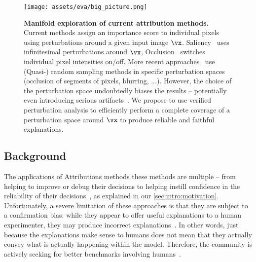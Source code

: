 \begin{figure}[t!]
  \centering
  \texttt{[image: assets/eva/big\_picture.png]}
  \caption{
  \textbf{Manifold exploration of current attribution methods.}
  Current methods assign an importance score to individual pixels using perturbations around a given input image $\vx$. Saliency~\cite{simonyan2013deep} uses infinitesimal perturbations around $\vx$, Occlusion~\cite{zeiler2013visualizing} switches individual pixel intensities on/off. More recent approaches~\cite{ribeiro2016lime, lundberg2017unified, petsiuk2018rise, fel2021sobol, novello2022making} use (Quasi-) random sampling methods in specific perturbation spaces (occlusion of segments of pixels, blurring, ...). However, the choice of the perturbation space undoubtedly biases the results -- potentially even introducing serious artifacts~\cite{sturmfels2020visualizing,hsieh2020evaluations,haug2021baselines,kindermans2019reliability}.
  We propose to use verified perturbation analysis to efficiently perform a complete coverage of a perturbation space around $\vx$ to produce reliable and faithful explanations.
  }
  \label{fig:eva:big_picture}
\end{figure}

\subsection{Background}

The applications of Attributions methods these methods are multiple -- from helping to improve or debug their decisions to helping instill confidence in the reliability of their decisions~\cite{doshivelez2017rigorous}, as explained in our  \autoref{sec:intro:motivation}. 
Unfortunately, a severe limitation of these approaches is that they are subject to a confirmation bias: while they appear to offer useful explanations to a human experimenter, they may produce incorrect explanations~\cite{adebayo2018sanity, ghorbani2017interpretation, slack2021counterfactual}.
In other words, just because the explanations make sense to humans does not mean that they actually convey what is actually happening within the model.
Therefore, the community is actively seeking for better benchmarks involving humans~\cite{hsieh2020evaluations,nguyen2021effectiveness,fel2021cannot,kim2021hive}.

